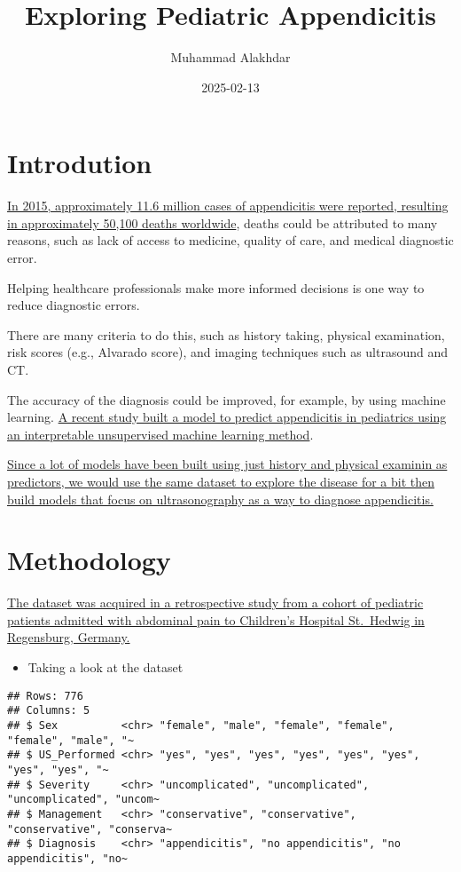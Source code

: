 \documentclass[
]{article}
\title{Exploring Pediatric Appendicitis}
\author{Muhammad Alakhdar}
\date{2025-02-13}
\providecommand{\tightlist}{%
  \setlength{\itemsep}{0pt}\setlength{\parskip}{0pt}}
\begin{document}
\maketitle

\section{Introdution}\label{introdution}

\href{https://doi.org/10.1016/S0140-6736(16)31012-1}{In 2015,
approximately 11.6 million cases of appendicitis were reported,
resulting in approximately 50,100 deaths worldwide}, deaths could be
attributed to many reasons, such as lack of access to medicine, quality
of care, and medical diagnostic error.

Helping healthcare professionals make more informed decisions is one way
to reduce diagnostic errors.

There are many criteria to do this, such as history taking, physical
examination, risk scores (e.g., Alvarado score), and imaging techniques
such as ultrasound and CT.

The accuracy of the diagnosis could be improved, for example, by using
machine learning. \href{https://doi.org/10.1016/j.media.2023.103042}{A
recent study built a model to predict appendicitis in pediatrics using
an interpretable unsupervised machine learning method}.

\href{https://doi.org/10.5281/zenodo.7711412}{Since a lot of models have
been built using just history and physical examinin as predictors, we
would use the same dataset to explore the disease for a bit then build
models that focus on ultrasonography as a way to diagnose appendicitis.}

\section{Methodology}\label{methodology}

\href{https://doi.org/10.5281/zenodo.7711412}{The dataset was acquired
in a retrospective study from a cohort of pediatric patients admitted
with abdominal pain to Children's Hospital St.~Hedwig in Regensburg,
Germany.}

\begin{itemize}
\tightlist
\item
  Taking a look at the dataset
\end{itemize}

\begin{verbatim}
## Rows: 776
## Columns: 5
## $ Sex          <chr> "female", "male", "female", "female", "female", "male", "~
## $ US_Performed <chr> "yes", "yes", "yes", "yes", "yes", "yes", "yes", "yes", "~
## $ Severity     <chr> "uncomplicated", "uncomplicated", "uncomplicated", "uncom~
## $ Management   <chr> "conservative", "conservative", "conservative", "conserva~
## $ Diagnosis    <chr> "appendicitis", "no appendicitis", "no appendicitis", "no~
\end{verbatim}
\end{document}
